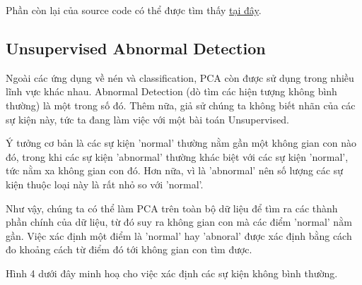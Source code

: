 Phần còn lại của source code có thể được tìm thấy \href{https://github.com/tiepvupsu/tiepvupsu.github.io/blob/master/assets/28_pca2/python/EigenFaces.ipynb}{tại đây}. 
 
 
\subsection{Unsupervised Abnormal Detection}
Ngoài các ứng dụng về nén và classification, PCA còn được sử dụng trong nhiều lĩnh vực khác nhau. Abnormal Detection (dò tìm các hiện tượng không bình thường) là một trong số đó. Thêm nữa, giả sử chúng ta không biết nhãn của các sự kiện này, tức ta đang làm việc với một bài toán Unsupervised. 
 
 Ý tưởng cơ bản là các sự kiện 'normal' thường nằm gần một không gian con nào đó, trong khi các sự kiện 'abnormal' thường khác biệt với các sự kiện 'normal', tức nằm xa không gian con đó. Hơn nữa, vì là 'abnormal' nên số lượng các sự kiện thuộc loại này là rất nhỏ so với 'normal'. 
 
Như vậy, chúng ta có thể làm PCA trên toàn bộ dữ liệu để tìm ra các thành phần chính của dữ liệu, từ đó suy ra không gian con mà các điểm 'normal' nằm gần. Việc xác định một điểm là 'normal' hay 'abnoral' được xác định bằng cách đo khoảng cách từ điểm đó tới không gian con tìm được. 
 
Hình 4 dưới đây minh hoạ cho việc xác định các sự kiện không bình thường. 
 
 

